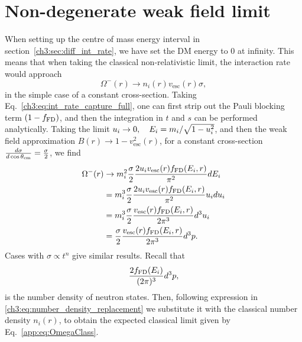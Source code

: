 \section{Non-degenerate weak field limit}
\label{app:sec:weakfieldlimit}


When setting up the centre of mass energy interval in section~\ref{ch3:sec:diff_int_rate}, we have set the DM energy to 0 at infinity. This means that when taking the classical non-relativistic limit, the interaction rate would approach 
\begin{equation}
\Omega^{-}(r) \rightarrow n_i(r) v_\mathrm{esc}(r) \sigma, \label{app:eq:OmegaClass}
\end{equation}
in the simple case of a constant cross-section. Taking Eq.~\ref{ch3:eq:int_rate_capture_full}, one can first strip out the Pauli blocking term $(1-f_{\rm FD})$, and then the integration in $t$ and $s$ can be performed analytically. Taking the limit $u_i\rightarrow0, \quad E_i=m_i/\sqrt{1-u_i^2}$, and then the weak field approximation $B(r)\rightarrow1-v_\mathrm{esc}^2(r)$, for a constant cross-section $\frac{d\sigma}{d\cos\theta_\mathrm{cm}}=\frac{\sigma}{2}$, we find 
\begin{align}
\Omega^{-}(r) &\rightarrow m_i^2 \frac{\sigma}{2}\frac{2u_i v_\mathrm{esc}(r) f_{\rm FD}(E_i,r)}{\pi^2}dE_i \\
& = m_i^3 \frac{\sigma}{2} \frac{2u_i v_\mathrm{esc}(r)  f_{\rm FD}(E_i,r)}{\pi^2}u_i du_i  \\ 
&= m_i^3 \frac{\sigma}{2}\frac{v_\mathrm{esc}(r)  f_{\rm FD}(E_i,r)}{2\pi^3} d^3u_i \\
& = \frac{\sigma}{2} \frac{v_\mathrm{esc}(r)  f_{\rm FD}(E_i,r)}{2\pi^3} d^3p. 
\end{align}
Cases with $\sigma\propto t^n$ give similar results.
Recall that
\begin{equation}
    \frac{2f_{\rm FD}(E_i)}{(2\pi)^3} d^3p,
\end{equation}
is the number density of neutron states. Then, following expression in \ref{ch3:eq:number_density_replacement} we substitute it with the classical number density $n_i(r)$, to obtain the expected classical limit given by Eq.~\ref{app:eq:OmegaClass}. 




